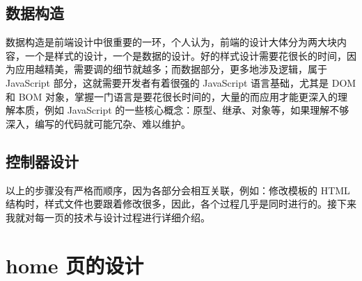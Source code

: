 \documentclass[UTF8]{ctexbook}
\begin{document}
    \subsection{数据构造}
      \label{subsec:数据构造}
        数据构造是前端设计中很重要的一环，个人认为，前端的设计大体分为两大块内容，一个是样式的设计，一个是数据的设计。好的样式设计需要花很长的时间，因为应用越精美，需要调的细节就越多；而数据部分，更多地涉及逻辑，属于 JavaScript 部分，这就需要开发者有着很强的 JavaScript 语言基础，尤其是 DOM 和 BOM 对象，掌握一门语言是要花很长时间的，大量的而应用才能更深入的理解本质，例如 JavaScript 的一些核心概念：原型、继承、对象等，如果理解不够深入，编写的代码就可能冗杂、难以维护。


    \subsection{控制器设计}
      \label{subsec:控制器设计}

      \par
      以上的步骤没有严格而顺序，因为各部分会相互关联，例如：修改模板的 HTML 结构时，样式文件也要跟着修改很多，因此，各个过程几乎是同时进行的。接下来我就对每一页的技术与设计过程进行详细介绍。

  \section{home 页的设计}
    \label{sec:home_页的设计}
\end{document}
